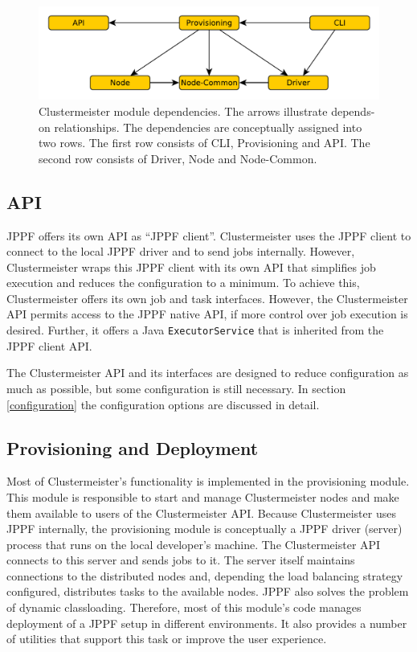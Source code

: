 \documentclass[english]{uzhpub}
\begin{document}
\begin{figure}[hp]
\centering
\includegraphics[scale=0.7]{images/module-deps.pdf}
\caption{Clustermeister module dependencies. The arrows illustrate depends-on relationships. The dependencies are conceptually assigned into two rows. The first row consists of CLI, Provisioning and API. The second row consists of Driver, Node and Node-Common.}
\label{fig:deps}
\end{figure}

\subsection{API}

JPPF offers its own API as ``JPPF client''. Clustermeister uses the JPPF client to connect to the local JPPF driver and to send jobs internally. However, Clustermeister wraps this JPPF client with its own API that simplifies job execution and reduces the configuration to a minimum. To achieve this, Clustermeister offers its own job and task interfaces. However, the Clustermeister API permits access to the JPPF native API, if more control over job execution is desired. Further, it offers a Java \texttt{ExecutorService} that is inherited from the JPPF client API.

The Clustermeister API and its interfaces are designed to reduce configuration as much as possible, but some configuration is still necessary. In section \ref{configuration} the configuration options are discussed in detail.

\subsection{Provisioning and Deployment}
Most of Clustermeister's functionality is implemented in the provisioning module. This module is responsible to start and manage Clustermeister nodes and make them available to users of the Clustermeister API. Because Clustermeister uses JPPF internally, the provisioning module is conceptually a JPPF driver (server) process that runs on the local developer's machine. The Clustermeister API connects to this server and sends jobs to it. The server itself maintains connections to the distributed nodes and, depending the load balancing strategy configured, distributes tasks to the available nodes. JPPF also solves the problem of dynamic classloading. Therefore, most of this module's code manages deployment of a JPPF setup in different environments. It also provides a number of utilities that support this task or improve the user experience.
\end{document}
